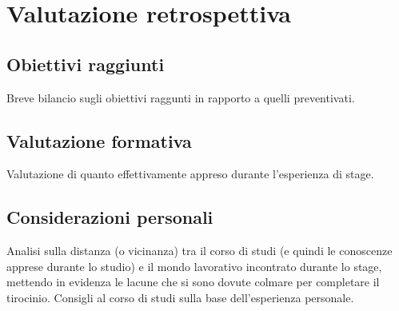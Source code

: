 
\chapter{Valutazione retrospettiva}
\label{cap:valutazione-retrospettiva}

\section{Obiettivi raggiunti}
Breve bilancio sugli obiettivi raggunti in rapporto a quelli preventivati.

\section{Valutazione formativa}
Valutazione di quanto effettivamente appreso durante l'esperienza di stage.

\section{Considerazioni personali}
Analisi sulla distanza (o vicinanza) tra il corso di studi (e quindi le conoscenze apprese durante lo studio) e il mondo lavorativo incontrato durante lo stage, mettendo in evidenza le lacune che si sono dovute colmare per completare il tirocinio.
Consigli al corso di studi sulla base dell'esperienza personale.
